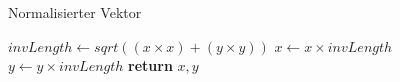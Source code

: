 \begin{algorithm}
	\caption{Normalisierter Vektor}
	\label{src:analyseNormalizedvector}
	\begin{algorithmic}[1]
			\State $invLength \gets sqrt(\left(x \times x\right) + \left(y \times y\right))$
			\State $x \gets x \times invLength$
			\State $y \gets y \times invLength$
			\State \textbf{return} $x,y$
		\EndProcedure
	\end{algorithmic}
\end{algorithm}
